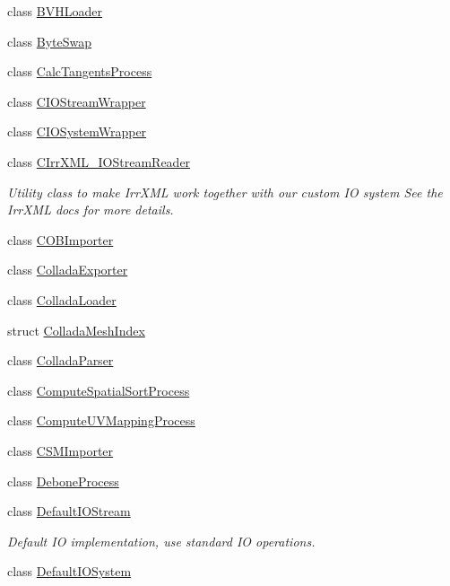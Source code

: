 \begin{DoxyCompactItemize}
class \hyperlink{class_assimp_1_1_b_v_h_loader}{B\+V\+H\+Loader}
\item 
class \hyperlink{class_assimp_1_1_byte_swap}{Byte\+Swap}
\item 
class \hyperlink{class_assimp_1_1_calc_tangents_process}{Calc\+Tangents\+Process}
\item 
class \hyperlink{class_assimp_1_1_c_i_o_stream_wrapper}{C\+I\+O\+Stream\+Wrapper}
\item 
class \hyperlink{class_assimp_1_1_c_i_o_system_wrapper}{C\+I\+O\+System\+Wrapper}
\item 
class \hyperlink{class_assimp_1_1_c_irr_x_m_l___i_o_stream_reader}{C\+Irr\+X\+M\+L\+\_\+\+I\+O\+Stream\+Reader}
\begin{DoxyCompactList}\small\item\em Utility class to make Irr\+X\+M\+L work together with our custom I\+O system See the Irr\+X\+M\+L docs for more details. \end{DoxyCompactList}\item 
class \hyperlink{class_assimp_1_1_c_o_b_importer}{C\+O\+B\+Importer}
\item 
class \hyperlink{class_assimp_1_1_collada_exporter}{Collada\+Exporter}
\item 
class \hyperlink{class_assimp_1_1_collada_loader}{Collada\+Loader}
\item 
struct \hyperlink{struct_assimp_1_1_collada_mesh_index}{Collada\+Mesh\+Index}
\item 
class \hyperlink{class_assimp_1_1_collada_parser}{Collada\+Parser}
\item 
class \hyperlink{class_assimp_1_1_compute_spatial_sort_process}{Compute\+Spatial\+Sort\+Process}
\item 
class \hyperlink{class_assimp_1_1_compute_u_v_mapping_process}{Compute\+U\+V\+Mapping\+Process}
\item 
class \hyperlink{class_assimp_1_1_c_s_m_importer}{C\+S\+M\+Importer}
\item 
class \hyperlink{class_assimp_1_1_debone_process}{Debone\+Process}
\item 
class \hyperlink{class_assimp_1_1_default_i_o_stream}{Default\+I\+O\+Stream}
\begin{DoxyCompactList}\small\item\em Default I\+O implementation, use standard I\+O operations. \end{DoxyCompactList}\item 
class \hyperlink{class_assimp_1_1_default_i_o_system}{Default\+I\+O\+System}

\end{DoxyCompactItemize}
